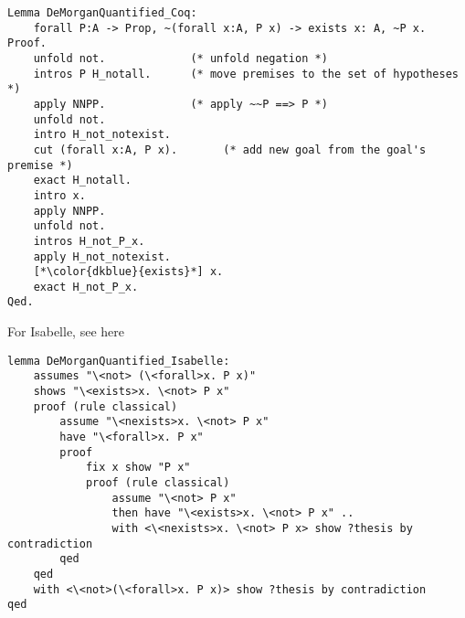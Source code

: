 \documentclass[article]{aaltoseries}
\begin{document}
\begin{lstlisting}[language=coq]
Lemma DeMorganQuantified_Coq:
    forall P:A -> Prop, ~(forall x:A, P x) -> exists x: A, ~P x.
Proof.
    unfold not.             (* unfold negation *)
    intros P H_notall.      (* move premises to the set of hypotheses *)
    apply NNPP.             (* apply ~~P ==> P *)
    unfold not.
    intro H_not_notexist.
    cut (forall x:A, P x).       (* add new goal from the goal's premise *)
    exact H_notall.
    intro x.
    apply NNPP.
    unfold not.
    intros H_not_P_x.
    apply H_not_notexist.
    [*\color{dkblue}{exists}*] x.
    exact H_not_P_x.
Qed.
\end{lstlisting}

For Isabelle, see here %
\begin{lstlisting}[language=isabelle]
lemma DeMorganQuantified_Isabelle:
    assumes "\<not> (\<forall>x. P x)"
    shows "\<exists>x. \<not> P x"
    proof (rule classical)
        assume "\<nexists>x. \<not> P x"
        have "\<forall>x. P x"
        proof
            fix x show "P x"
            proof (rule classical)
                assume "\<not> P x"
                then have "\<exists>x. \<not> P x" ..
                with <\<nexists>x. \<not> P x> show ?thesis by contradiction
        qed
    qed
    with <\<not>(\<forall>x. P x)> show ?thesis by contradiction
qed
\end{lstlisting}





\end{document}
